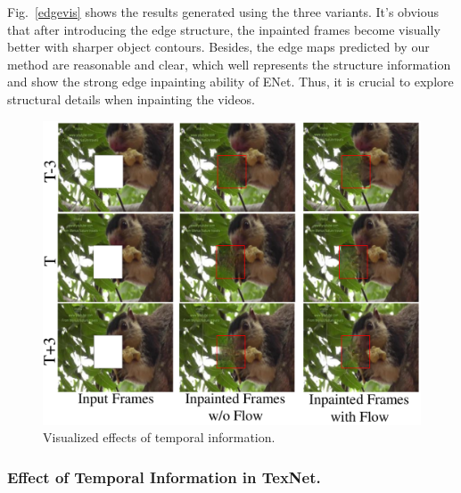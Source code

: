Fig.~\ref{edgevis} shows the results generated using the three variants. 
It's obvious that after introducing the edge structure, the inpainted frames become visually better with sharper object contours. 
Besides, the edge maps predicted by our method are reasonable and clear, which well represents the structure information and show the strong edge inpainting ability of ENet. Thus, it is crucial to explore structural details when inpainting the videos.




\begin{figure}[t]
	\centering
	\includegraphics[width=1.0\columnwidth]{flow_vis} %
	\caption{Visualized effects of temporal information.}
	\label{flow_vis}
\end{figure}

\subsubsection{Effect of Temporal Information in TexNet.}

